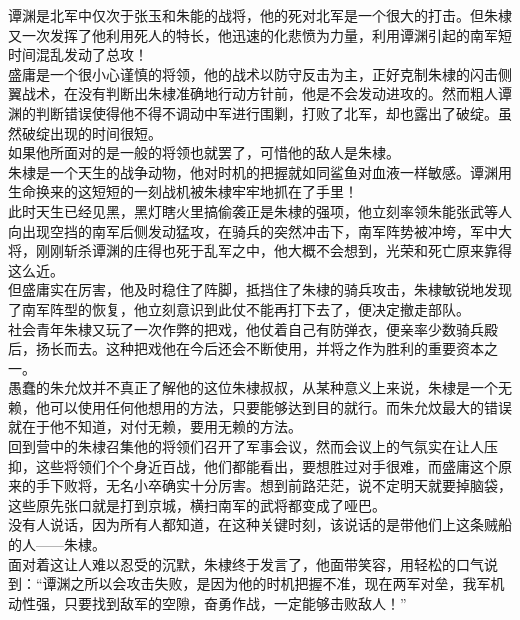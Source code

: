 \begin{multicols}{\theparacolNo}
谭渊是北军中仅次于张玉和朱能的战将，他的死对北军是一个很大的打击。但朱棣又一次发挥了他利用死人的特长，他迅速的化悲愤为力量，利用谭渊引起的南军短时间混乱发动了总攻！\\

盛庸是一个很小心谨慎的将领，他的战术以防守反击为主，正好克制朱棣的闪击侧翼战术，在没有判断出朱棣准确地行动方针前，他是不会发动进攻的。然而粗人谭渊的判断错误使得他不得不调动中军进行围剿，打败了北军，却也露出了破绽。虽然破绽出现的时间很短。\\

如果他所面对的是一般的将领也就罢了，可惜他的敌人是朱棣。\\

朱棣是一个天生的战争动物，他对时机的把握就如同鲨鱼对血液一样敏感。谭渊用生命换来的这短短的一刻战机被朱棣牢牢地抓在了手里！\\

此时天生已经见黑，黑灯瞎火里搞偷袭正是朱棣的强项，他立刻率领朱能张武等人向出现空挡的南军后侧发动猛攻，在骑兵的突然冲击下，南军阵势被冲垮，军中大将，刚刚斩杀谭渊的庄得也死于乱军之中，他大概不会想到，光荣和死亡原来靠得这么近。\\

但盛庸实在厉害，他及时稳住了阵脚，抵挡住了朱棣的骑兵攻击，朱棣敏锐地发现了南军阵型的恢复，他立刻意识到此仗不能再打下去了，便决定撤走部队。\\

社会青年朱棣又玩了一次作弊的把戏，他仗着自己有防弹衣，便亲率少数骑兵殿后，扬长而去。这种把戏他在今后还会不断使用，并将之作为胜利的重要资本之一。\\

愚蠢的朱允炆并不真正了解他的这位朱棣叔叔，从某种意义上来说，朱棣是一个无赖，他可以使用任何他想用的方法，只要能够达到目的就行。而朱允炆最大的错误就在于他不知道，对付无赖，要用无赖的方法。\\

回到营中的朱棣召集他的将领们召开了军事会议，然而会议上的气氛实在让人压抑，这些将领们个个身近百战，他们都能看出，要想胜过对手很难，而盛庸这个原来的手下败将，无名小卒确实十分厉害。想到前路茫茫，说不定明天就要掉脑袋，这些原先张口就是打到京城，横扫南军的武将都变成了哑巴。\\

没有人说话，因为所有人都知道，在这种关键时刻，该说话的是带他们上这条贼船的人——朱棣。\\

面对着这让人难以忍受的沉默，朱棣终于发言了，他面带笑容，用轻松的口气说到：“谭渊之所以会攻击失败，是因为他的时机把握不准，现在两军对垒，我军机动性强，只要找到敌军的空隙，奋勇作战，一定能够击败敌人！”\\


\end{multicols}
